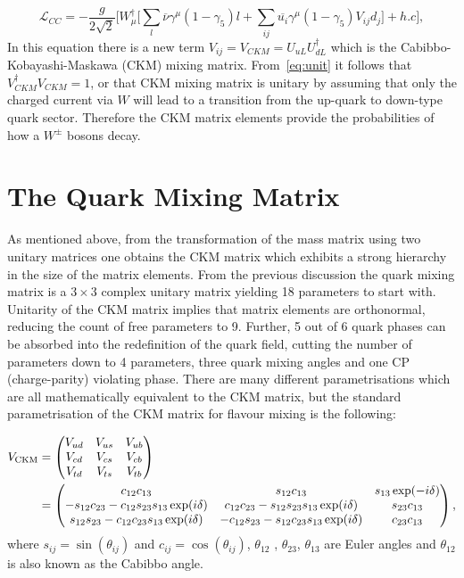 \begin{equation}
	\mathcal{L}_{CC}= - \frac{g}{2\sqrt{2}}\Big[W^{\dagger}_{\mu}\big[\sum_{l}\overline{\nu}\gamma^{\mu}(1-\gamma_{5})l + \sum_{ij}\overline{u_{i}}\gamma^{\mu}(1-\gamma_{5})V_{ij}d_{j}\big] + h.c\Big], 
\label{eq:LC}
\end{equation}
In this equation there is a new term $V_{ij}=V_{CKM}= U_{uL} U_{dL}^\dag$ which is the Cabibbo-Kobayashi-Maskawa (CKM) mixing matrix. From~\autoref{eq:unit} it follows that $V^{\dagger}_{CKM}V_{CKM}=1$, or that \gls{CKM} mixing matrix is unitary by assuming that only the charged current via $W$ will lead to a transition from the up-quark to down-type quark sector. Therefore the CKM matrix elements provide the probabilities of how a $W^{\pm}$ bosons decay.
 





\section{The Quark Mixing Matrix}
\label{ckm}
As mentioned above, from the transformation of the mass matrix using two unitary matrices one obtains the \gls{CKM} matrix which exhibits a strong hierarchy in the size of the matrix elements. From the previous discussion the quark mixing matrix is a $3 \times 3$ complex unitary matrix yielding 18 parameters to start with. Unitarity of the \gls{CKM} matrix implies that matrix elements are orthonormal, reducing the count of free parameters to 9. Further, 5 out of 6 quark phases can be absorbed into the redefinition of the quark field, cutting the number of parameters down to 4 parameters, three quark mixing angles and one CP (charge-parity) violating phase. There are many different parametrisations which are all mathematically equivalent to the \gls{CKM} matrix, but the standard parametrisation of the \gls{CKM} matrix for flavour mixing is the following:

\begin{align}
V_{\rm CKM} &=  \begin{pmatrix}   V_{ud} & V_{us} & V_{ub} \cr
    V_{cd} & V_{cs} & V_{cb} \cr
    V_{td} & V_{ts} & V_{tb} \cr \end{pmatrix} \\
 &= \begin{pmatrix}c_{12}c_{13}& s_{12}c_{13} & s_{13}\exp(-i\delta) \cr
-s_{12}c_{23}-c_{12}s_{23}s_{13}\exp(i\delta) & c_{12}c_{23}- 
s_{12}s_{23}s_{13}\exp(i\delta) & s_{23}c_{13} \cr 
s_{12}s_{23}- c_{12}c_{23}s_{13}\exp(i\delta) & 
-c_{12}s_{23}-s_{12}c_{23}s_{13}\exp(i\delta) & c_{23}c_{13}\end{pmatrix},
\end{align}
where $s_{ij} = \sin(\theta_{ij})$ and $c_{ij} = \cos(\theta_{ij})$, $\theta_{12}$ , $\theta_{23}$, $\theta_{13}$ are Euler angles and $\theta_{12}$ is also known as the Cabibbo angle.

